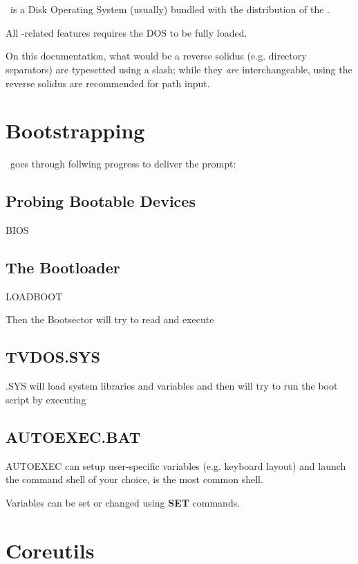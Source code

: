\chapter{\thedos}

\thedos\ is a Disk Operating System (usually) bundled with the distribution of the \thismachine.

All \thedos-related features requires the DOS to be fully loaded.

On this documentation, what would be a reverse solidus (e.g. directory separators) are typesetted using a slash; while they \emph{are} interchangeable, using the reverse solidus are recommended for path input.


\chapter{Bootstrapping}

\thedos\ goes through follwing progress to deliver the  prompt:

\section{Probing Bootable Devices}
BIOS

\section{The Bootloader}
LOADBOOT

Then the Bootsector will try to read and execute 

\section{TVDOS.SYS}
\thedos.SYS will load system libraries and variables and then will try to run the boot script by executing 

\section{AUTOEXEC.BAT}

AUTOEXEC can setup user-specific variables (e.g. keyboard layout) and launch the command shell of your choice,  is the most common shell.

Variables can be set or changed using \textbf{SET} commands.



\chapter{Coreutils}

